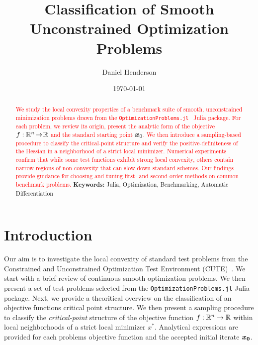 \documentclass[10pt]{article}
\title{Classification of Smooth Unconstrained Optimization Problems}
\author{Daniel Henderson}
\date{\today}
\begin{document}
\maketitle

\begin{abstract}
    \noindent
    \textcolor{Red}{
    We study the local convexity properties of a benchmark suite of smooth,
    unconstrained minimization problems drawn from the
    \texttt{OptimizationProblems.jl}~\cite{OptimizationProblems} Julia package.
    For each problem, we review its origin, present the analytic form
    of the objective $f:\mathbb{R}^n\!\to\!\mathbb{R}$ and the standard starting point
    $\bm{x}_0$.  We then introduce a sampling-based procedure to classify
    the critical-point structure and verify the positive-definiteness of
    the Hessian in a neighborhood of a strict local minimizer.  Numerical
    experiments confirm that while some test functions exhibit strong
    local convexity, others contain narrow regions of non-convexity that
    can slow down standard schemes.  Our findings provide guidance for
    choosing and tuning first- and second-order methods on common
    benchmark problems.
    }
    \noindent\textbf{Keywords:} Julia, Optimization, Benchmarking, Automatic Differentiation
\end{abstract}



\tableofcontents
\newpage


\section{Introduction}
    Our aim is to investigate the local convexity of standard
    test problems from the Constrained and Unconstrained Optimization Test
    Environment (CUTE)~\cite{CUTE}. We start with a brief review of continuous
    smooth optimization problems.
    We then present a set of test problems selected from the
    \texttt{OptimizationProblems.jl} \cite{OptimizationProblems}
    Julia package. Next, we provide a theoritical overview on 
    the classification of an objective functions critical point
    structure. We then present a sampling procedure to classify
    the \emph{critical-point} structure of the objective function
    $f: \mathbb{R}^n \rightarrow \mathbb{R}$ within local neighborhoods of a strict
    local minimizer $x^*$. Analytical expressions are provided for
    each problems objective function and the accepted initial iterate
    $\bm{x_0}$.
    \medskip
\end{document}
